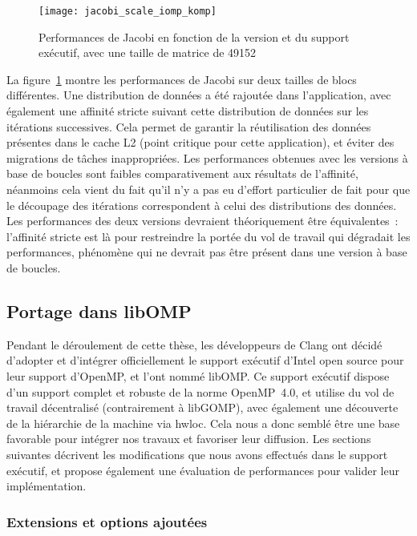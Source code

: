 \begin{figure}[ht]
  \centering
  \texttt{[image: jacobi\_scale\_iomp\_komp]}
  \caption{Performances de Jacobi en fonction de la version et du support exécutif, avec une taille de matrice de 49152}\label{fig:contribs:perf_eval:eval-jacobi}
\end{figure}

La figure~\ref{fig:contribs:perf_eval:eval-jacobi} montre les performances de Jacobi sur deux tailles de blocs différentes.
Une distribution de données a été rajoutée dans l'application, avec également une affinité stricte suivant cette distribution de données sur les itérations successives.
Cela permet de garantir la réutilisation des données présentes dans le cache L2 (point critique pour cette application), et éviter des migrations de tâches inappropriées.
Les performances obtenues avec les versions à base de boucles sont faibles comparativement aux résultats de l'affinité, néanmoins cela vient du fait qu'il n'y a pas eu d'effort particulier de fait pour que le découpage des itérations correspondent à celui des distributions des données.
Les performances des deux versions devraient théoriquement être équivalentes~: l'affinité stricte est là pour restreindre la portée du vol de travail qui dégradait les performances, phénomène qui ne devrait pas être présent dans une version à base de boucles.



\subsection{Portage dans libOMP}\label{sec:contribs:perf_eval:libkomp}

Pendant le déroulement de cette thèse, les développeurs de Clang ont décidé d'adopter et d'intégrer officiellement le support exécutif d'Intel open source pour leur support d'OpenMP, et l'ont nommé libOMP.
Ce support exécutif dispose d'un support complet et robuste de la norme OpenMP~4.0, et utilise du vol de travail décentralisé (contrairement à libGOMP), avec également une découverte de la hiérarchie de la machine via hwloc.
Cela nous a donc semblé être une base favorable pour intégrer nos travaux et favoriser leur diffusion.
Les sections suivantes décrivent les modifications que nous avons effectués dans le support exécutif, et propose également une évaluation de performances pour valider leur implémentation.

\subsubsection{Extensions et options ajoutées}


